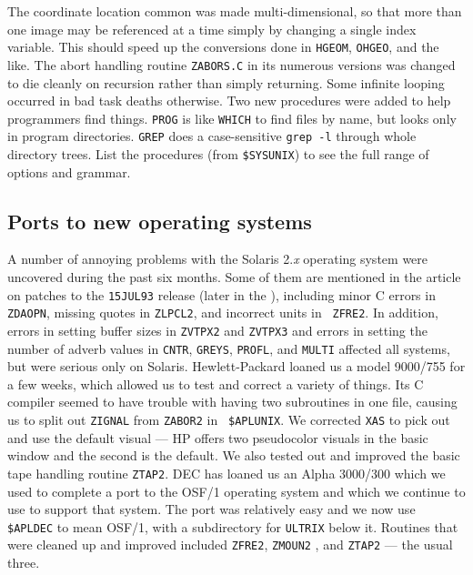 The coordinate location common was made multi-dimensional, so that
more than one image may be referenced at a time simply by changing a
single index variable.  This should speed up the conversions done in
{\tt HGEOM}, {\tt OHGEO}, and the like.  The abort handling routine
{\tt ZABORS.C} in its numerous versions was changed to die cleanly on
recursion rather than simply returning.  Some infinite looping
occurred in bad task deaths otherwise.  Two new procedures were added
to help programmers find things.  {\tt PROG} is like {\tt WHICH} to
find files by name, but looks only in program directories.  {\tt GREP}
does a case-sensitive {\tt grep -l} through whole directory trees.
List the procedures (from {\tt \$SYSUNIX}) to see the full range of
options and grammar.

\subsection{Ports to new operating systems}

A number of annoying problems with the Solaris 2.{\it x} operating
system were uncovered during the past six months.  Some of them are
mentioned in the article on patches to the {\tt 15JUL93} release
(later in the \Aipsletter), including minor C errors in {\tt ZDAOPN},
missing quotes in {\tt ZLPCL2}, and incorrect units in \hbox{{\tt
ZFRE2}}.  In addition, errors in setting buffer sizes in {\tt ZVTPX2}
and {\tt ZVTPX3} and errors in setting the number of adverb values in
{\tt CNTR}, {\tt GREYS}, {\tt PROFL}, and {\tt MULTI} affected all
systems, but were serious only on Solaris.
Hewlett-Packard loaned us a model 9000/755 for a few weeks, which
allowed us to test and correct a variety of things.  Its C compiler
seemed to have trouble with having two subroutines in one file,
causing us to split out {\tt ZIGNAL} from {\tt ZABOR2} in \hbox{{\tt
\$APLUNIX}}.  We corrected {\tt XAS} to pick out and use the default
visual --- HP offers two pseudocolor visuals  in the basic window and
the second is the default.  We also tested out and improved the basic
tape handling routine \hbox{{\tt ZTAP2}}.
DEC has loaned us an Alpha 3000/300 which we used to complete a port
to the OSF/1 operating system and which we continue to use to support
that system.  The port was relatively easy and we now use {\tt
\$APLDEC} to mean OSF/1, with a subdirectory for {\tt ULTRIX} below
it.  Routines that were cleaned up and improved included {\tt ZFRE2},
{\tt ZMOUN2}  , and {\tt ZTAP2} --- the usual three.

